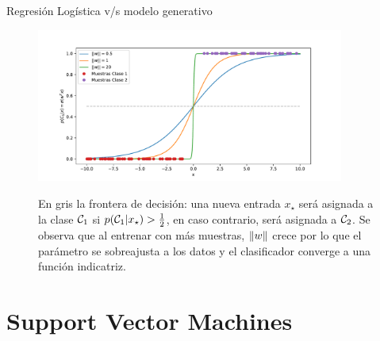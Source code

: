 \documentclass[9pt]{beamer}
\begin{document}
\begin{frame}{Regresión Logística v/s modelo generativo}
\begin{figure}[H]
  \centering
  \includegraphics[width=0.9\textwidth]{../img/cap3_logistica.pdf}\\
  \caption{En gris la frontera de decisión: una nueva entrada $x_\star$ será asignada a la clase ${\mathcal C}_1$ si $p({\mathcal C}_1|x_\star)>\frac{1}{2}$, en caso contrario, será asignada a ${\mathcal C}_2$. Se observa que al entrenar con más muestras, $\left\lVert w\right\rVert$ crece por lo que el parámetro se sobreajusta a los datos y el clasificador converge a una función indicatriz.}
\end{figure}


\end{frame}

\section{Support Vector Machines}


\end{document}
